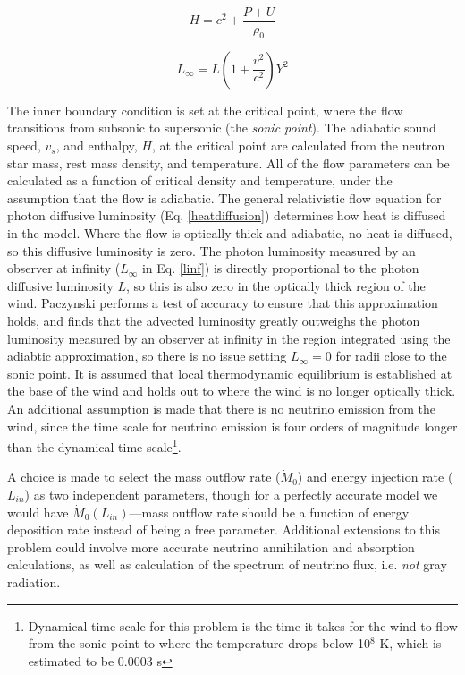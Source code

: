 \documentclass[onecolumn]{aastex63}
\begin{document}
\begin{equation}
    H = c^2 + \frac{P + U}{\rho_0}
\end{equation}
        
\begin{equation} \label{linf}
    L_{\infty} = L\left(1 + \frac{v^2}{c^2}\right)Y^2
\end{equation}
        
The inner boundary condition is set at the critical point, where the flow transitions from subsonic to supersonic (the \textit{sonic point}). The adiabatic sound speed, $v_s$, and enthalpy, $H$, at the critical point are calculated from the neutron star mass, rest mass density, and temperature. All of the flow parameters can be calculated as a function of critical density and temperature, under the assumption that the flow is adiabatic. The general relativistic flow equation for photon diffusive luminosity (Eq. \ref{heatdiffusion}) determines how heat is diffused in the model. Where the flow is optically thick and adiabatic, no heat is diffused, so this diffusive luminosity is zero. The photon luminosity measured by an observer at infinity ($L_\infty$ in Eq. \ref{linf}) is directly proportional to the photon diffusive luminosity $L$, so this is also zero in the optically thick region of the wind. Paczynski performs a test of accuracy to ensure that this approximation holds, and finds that the advected luminosity greatly outweighs the photon luminosity measured by an observer at infinity in the region integrated using the adiabtic approximation, so there is no issue setting $L_\infty = 0$ for radii close to the sonic point. It is assumed that local thermodynamic equilibrium is established at the base of the wind and holds out to where the wind is no longer optically thick. An additional assumption is made that there is no neutrino emission from the wind, since the time scale for neutrino emission is four orders of magnitude longer than the dynamical time scale\footnote{Dynamical time scale for this problem is the time it takes for the wind to flow from the sonic point to where the temperature drops below 10$^8$ K, which is estimated to be $0.0003$ s}.

A choice is made to select the mass outflow rate ($\dot M_0$) and energy injection rate ($L_{in}$) as two independent parameters, though for a perfectly accurate model we would have $\dot M_0 (L_{in})$---mass outflow rate should be a function of energy deposition rate instead of being a free parameter. Additional extensions to this problem could involve more accurate neutrino annihilation and absorption calculations, as well as calculation of the spectrum of neutrino flux, i.e. \textit{not} gray radiation. 
        
\end{document}
